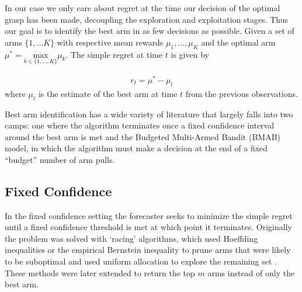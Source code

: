 \documentclass[letterpaper, 10 pt, conference]{ieeeconf}  %
\begin{document}
In our case we only care about regret at the time our decision of the optimal grasp has been made, decoupling the exploration and exploitation stages. 
Thus our goal is to identify the best arm in as few decisions as possible.
Given a set of arms $\lbrace 1,...K \rbrace$ with respective mean rewards $\mu_1, ..., \mu_K$ and the optimal arm $\mu^* = \underset{k\in\lbrace 1, ..., K \rbrace}{\mbox{max}} \mu_k$.
The simple regret at time $t$ is given by

\vspace{-2ex}
\begin{align}\label{eq:simple_regret}
r_t = \mu^* - \mu_t
\end{align}
\noindent where $\mu_t$ is the estimate of the best arm at time $t$ from the previous observations. 

Best arm identification has a wide variety of literature that largely falls into two camps: one where the algorithm terminates once a fixed confidence interval around the best arm is met and the Budgeted Multi-Armed Bandit (BMAB) model, in which the algorithm must make a decision at the end of a fixed ``budget'' number of arm pulls.

\subsection{Fixed Confidence}
In the fixed confidence setting the forecaster seeks to minimize the simple regret until a fixed confidence threshold is met at which point it terminates. Originally the problem was solved with `racing' algorithms, which used Hoeffding inequalities or the empirical Bernstein inequality to prune arms that were likely to be suboptimal and used uniform allocation to explore the remaining set \cite{maron1993hoeffding} \cite{mnih2008empirical}. These methods were later extended to return the top $m$ arms instead of only the best arm\cite{gabillon2012best}.
\end{document}
